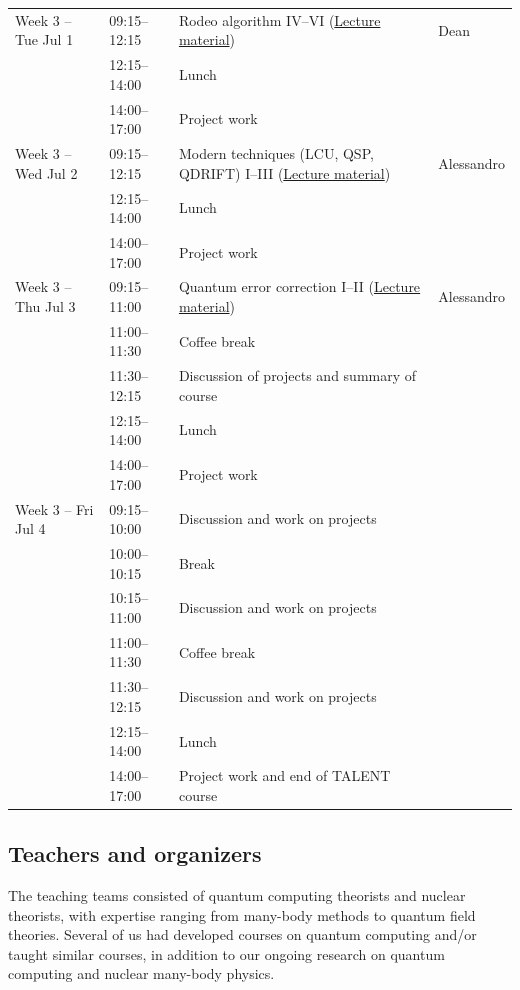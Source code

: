 \documentclass[prc,amsart,english]{revtex4-2}
\begin{document}
\begin{table}[hbtp]
{\begin{tabular}{l l l l}
Week 3 -- Tue Jul 1 & 09:15--12:15 & Rodeo algorithm IV--VI (\href{https://github.com/NuclearTalent/TalentQuantumComputingECT2025/blob/main/doc/pub/TuesdayJuly1/}{Lecture material}) & Dean \\
& 12:15--14:00 & Lunch &  \\
& 14:00--17:00 & Project work &  \\

Week 3 -- Wed Jul 2 & 09:15--12:15 & Modern techniques (LCU, QSP, QDRIFT) I--III (\href{https://github.com/NuclearTalent/TalentQuantumComputingECT2025/blob/main/doc/pub/WednesdayJuly2/}{Lecture material}) & Alessandro \\
& 12:15--14:00 & Lunch &  \\
& 14:00--17:00 & Project work &  \\

Week 3 -- Thu Jul 3 & 09:15--11:00 & Quantum error correction I--II (\href{https://github.com/NuclearTalent/TalentQuantumComputingECT2025/blob/main/doc/pub/ThursdayJuly3/}{Lecture material}) & Alessandro \\
& 11:00--11:30 & Coffee break &  \\
& 11:30--12:15 & Discussion of projects and summary of course &  \\
& 12:15--14:00 & Lunch &  \\
& 14:00--17:00 & Project work &  \\

Week 3 -- Fri Jul 4 & 09:15--10:00 & Discussion and work on projects &  \\
& 10:00--10:15 & Break &  \\
& 10:15--11:00 & Discussion and work on projects &  \\
& 11:00--11:30 & Coffee break &  \\
& 11:30--12:15 & Discussion and work on projects &  \\
& 12:15--14:00 & Lunch &  \\
& 14:00--17:00 & Project work and end of TALENT course &  \\ \hline
\end{tabular}
}
\end{table}



\subsection{Teachers and organizers}
The teaching teams consisted of quantum computing theorists and nuclear
theorists, with expertise ranging from many-body methods to quantum
field theories. Several of us had developed courses on quantum
computing and/or taught similar courses, in addition to our ongoing
research on quantum computing and nuclear many-body physics. 
\end{document}
